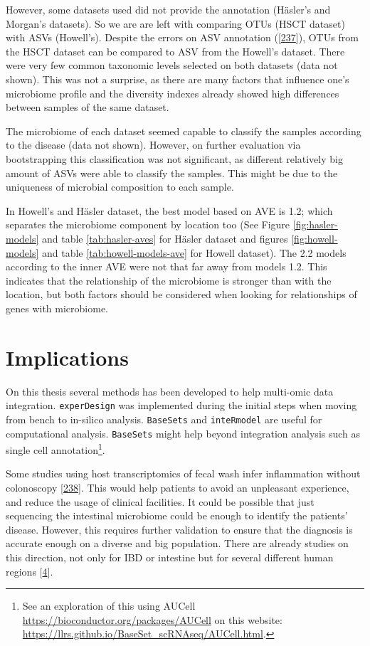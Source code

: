 \documentclass[
  12pt,
  a4paper,
  twoside,
  openright]{book}
\begin{document}
However, some datasets used did not provide the annotation (Häsler's and Morgan's datasets).
So we are are left with comparing OTUs (HSCT dataset) with ASVs (Howell's).
Despite the errors on ASV annotation ({[}\protect\hyperlink{ref-edgar2018}{237}{]}), OTUs from the HSCT dataset can be compared to ASV from the Howell's dataset.
There were very few common taxonomic levels selected on both datasets (data not shown).
This was not a surprise, as there are many factors that influence one's microbiome profile and the diversity indexes already showed high differences between samples of the same dataset.

The microbiome of each dataset seemed capable to classify the samples according to the disease (data not shown).
However, on further evaluation via bootstrapping this classification was not significant, as different relatively big amount of ASVs were able to classify the samples.
This might be due to the uniqueness of microbial composition to each sample.

In Howell's and Häsler dataset, the best model based on AVE is 1.2; which separates the microbiome component by location too (See Figure \ref{fig:hasler-models} and table \ref{tab:hasler-aves} for Häsler dataset and figures \ref{fig:howell-models} and table \ref{tab:howell-models-ave} for Howell dataset).
The 2.2 models according to the inner AVE were not that far away from models 1.2.
This indicates that the relationship of the microbiome is stronger than with the location, but both factors should be considered when looking for relationships of genes with microbiome.

\hypertarget{implications}{%
\section{Implications}\label{implications}}

On this thesis several methods has been developed to help multi-omic data integration.
\texttt{experDesign} was implemented during the initial steps when moving from bench to in-silico analysis.
\texttt{BaseSets} and \texttt{inteRmodel} are useful for computational analysis.
\texttt{BaseSets} might help beyond integration analysis such as single cell annotation\footnote{See an exploration of this using AUCell \url{https://bioconductor.org/packages/AUCell} on this website: \url{https://llrs.github.io/BaseSet_scRNAseq/AUCell.html}.}.

Some studies using host transcriptomics of fecal wash infer inflammation without colonoscopy {[}\protect\hyperlink{ref-ungar2022}{238}{]}.
This would help patients to avoid an unpleasant experience, and reduce the usage of clinical facilities.
It could be possible that just sequencing the intestinal microbiome could be enough to identify the patients' disease.
However, this requires further validation to ensure that the diagnosis is accurate enough on a diverse and big population.
There are already studies on this direction, not only for IBD or intestine but for several different human regions {[}\protect\hyperlink{ref-humanmicrobiomeprojectconsortium2012}{4}{]}.
\end{document}
